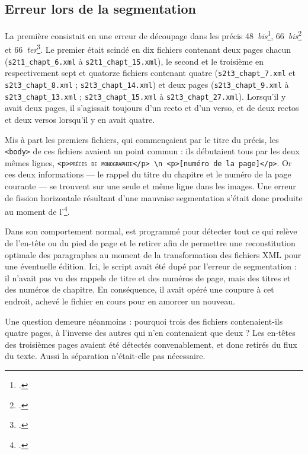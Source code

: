 \subsection{Erreur lors de la segmentation}

La première consistait en une erreur de découpage dans les précis \nos{}48~\textit{bis}\footcite{mono048b}, 66~\textit{bis}\footcite{mono066b} et 66~\textit{ter}\footcite{mono066c}. Le premier était scindé en dix fichiers contenant deux pages chacun (\texttt{s2t1\_cha\-pt\_6.xml} à \texttt{s2t1\_chapt\_15.xml}), le second et le troisième en respectivement sept et quatorze fichiers contenant quatre (\texttt{s2t3\_chapt\_7.xml} et \texttt{s2t3\_chapt\_8.xml} ; \texttt{s2t3\_chapt\_\-14.xml}) et deux pages (\texttt{s2t3\_chapt\_9.xml} à \texttt{s2t3\_chapt\_13.xml} ; \texttt{s2t3\_\-cha\-pt\_15.xml} à \texttt{s2t3\_chapt\_27.xml}). Lorsqu'il y avait deux pages, il s'agissait toujours d'un recto et d'un verso, et de deux rectos et deux versos lorsqu'il y en avait quatre.

Mis à part les premiers fichiers, qui commençaient par le titre du précis, les \texttt{<body>} de ces fichiers avaient un point commun : ils débutaient tous par les deux mêmes lignes, \texttt{<p>\textsc{précis de monographie}</p> \textbackslash n <p>[numéro de la page]</p>}. Or ces deux informations --- le rappel du titre du chapitre et le numéro de la page courante --- se trouvent sur une seule et même ligne dans les images. Une erreur de fission horizontale résultant d'une mauvaise segmentation s'était donc produite au moment de l'\ocr\footcite[p. 5-6]{karpinski}.

Dans son comportement normal, \lse{} est programmé pour détecter tout ce qui relève de l'en-tête ou du pied de page et le retirer afin de permettre une reconstitution optimale des paragraphes au moment de la transformation des fichiers XML pour une éventuelle édition. Ici, le script avait été dupé par l'erreur de segmentation : il n'avait pas vu des rappels de titre et des numéros de page, mais des titres et des numéros de chapitre. En conséquence, il avait opéré une coupure à cet endroit, \cad{} achevé le fichier en cours pour en amorcer un nouveau.

Une question demeure néanmoins : pourquoi trois des fichiers contenaient-ils quatre pages, à l'inverse des autres qui n'en contenaient que deux ? Les en-têtes des troisièmes pages avaient été détectés convenablement, et donc retirés du flux du texte. Aussi la séparation n'était-elle pas nécessaire.

